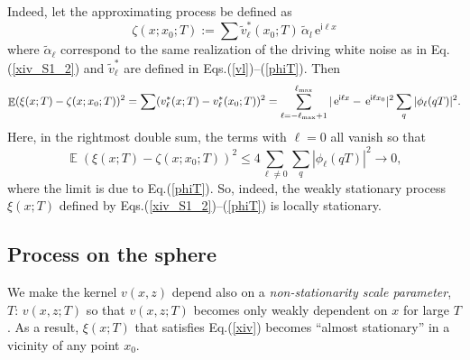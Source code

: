 \documentclass[12pt]{article}
\DeclareMathOperator{\Ex}{\mathbb{E}}
\newcommand{\e}{\mathrm{e}}
\renewcommand{\i}{\mathsf{i}}
\begin{document}
Indeed, let the approximating process be defined as
%
\begin {equation}
\label{zeta_S1}
\zeta(x; x_0; T):=\sum \widetilde v_\ell^*(x_0;T)  
                          \,\widetilde\alpha_{l} \, \e^{\i \ell x}
\end {equation}
%
where $\widetilde\alpha_{\ell}$ correspond to the same realization of the driving white noise as in  Eq.(\ref{xiv_S1_2})
and $\widetilde v_\ell^*$ are defined in Eqs.(\ref{vl})--(\ref{phiT}).
Then
%
\begin {equation}
\label{Edxi}
\Ex(\xi(x;T) - \zeta(x; x_0;T))^2 = \sum  (v_\ell^*(x;T) - v_\ell^*(x_0;T))^2 = 
  \sum_{\ell=-\ell_{\rm max}+1}^{\ell_{\rm max}} |\, \e^{\i \ell x} - \, \e^{\i \ell x_0}|^2   \sum_{q} |\phi_\ell(qT)|^2.
\end {equation}
%
Here, in the rightmost double sum, the terms with $\ell=0$ all vanish so that
%
\begin {equation}
\label{Edxi2}
\Ex(\xi(x;T) - \zeta(x; x_0;T))^2 \le 
  4 \sum_{\ell \ne 0}  \sum_{q} |\phi_\ell(qT)|^2 \to 0,
\end {equation}
%
where the limit is due to Eq.(\ref{phiT}). 
So, indeed, the weakly stationary process $\xi(x;T)$ defined by Eqs.(\ref{xiv_S1_2})--(\ref{phiT}) is
locally stationary.





\subsection{Process on the sphere}
\label{App_locStatio_S2} 




We  make the kernel $v(x,z)$ depend also on a 
{\em non-stationarity scale parameter}, $T$:  $v(x,z;T)$ so
that $v(x,z;T)$ becomes only weakly dependent on $x$
for large $T$. As a result, $\xi(x;T)$ that satisfies  Eq.(\ref{xiv}) 
becomes ``almost stationary'' in a vicinity of any point $x_0$.
\end{document}
